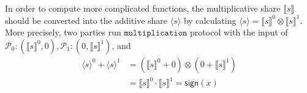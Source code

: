 \documentclass[letterpaper]{article} %
\begin{document}
    In order to compute more complicated functions,
    the multiplicative share $\llbracket s \rrbracket$ should be converted into the additive share $\langle s\rangle$
    by calculating $\langle s\rangle = \llbracket s \rrbracket ^{0}\otimes \llbracket s \rrbracket ^{1}$.
    More precisely, two parties run $\mathtt{multiplication}$ protocol with the input of
    $\mathcal{P}_{0}:(\llbracket s \rrbracket ^{0},0),\mathcal{P}_{1}:(0,\llbracket s \rrbracket ^{1})$, and
    \begin{align*}
        \langle s\rangle^{0} +\langle s\rangle^{1}&=(\llbracket s \rrbracket ^{0}+0)\otimes (0+\llbracket s \rrbracket ^{1})\\
        &=\llbracket s \rrbracket ^{0}\cdot \llbracket s \rrbracket ^{1}=\mathsf{sign}(x)
    \end{align*}
    \begin{figure}[ht]
\end{figure}
\end{document}
